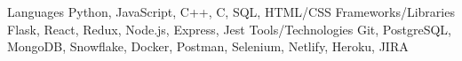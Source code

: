 
\begin{cvskills}
  \cvskill
    {Languages} %
    {Python, JavaScript, C++, C, SQL, HTML/CSS} %
  \cvskill
    {Frameworks/Libraries} %
    {Flask, React, Redux, Node.js, Express, Jest} %
  \cvskill
    {Tools/Technologies} %
    {Git, PostgreSQL, MongoDB, Snowflake, Docker, Postman, Selenium, Netlify, Heroku, JIRA} %
\end{cvskills}
